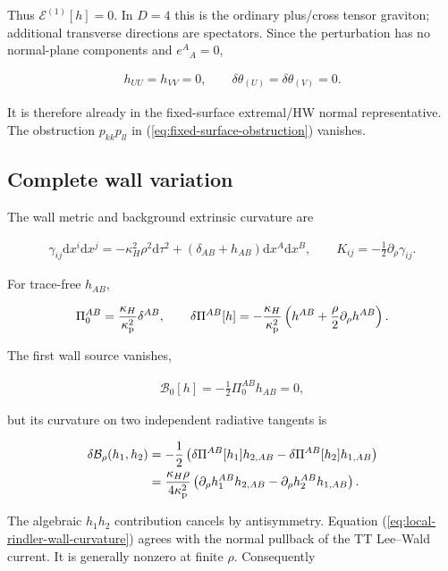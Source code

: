 Thus $\mathcal E^{(1)}[h]=0$. In $D=4$ this is the ordinary plus/cross tensor graviton; additional transverse directions are spectators. Since the perturbation has no normal-plane components and $e^A{}_A=0$,

\begin{align}
h_{UU}=h_{VV}=0,
\qquad
\delta\theta_{(U)}=\delta\theta_{(V)}=0.
\end{align}

It is therefore already in the fixed-surface extremal/HW normal representative. The obstruction $p_{kk}p_{ll}$ in (\ref{eq:fixed-surface-obstruction}) vanishes.

\subsection{Complete wall variation}\label{subsec:rindler-wall-variation}

The wall metric and background extrinsic curvature are

\begin{align}
\gamma_{ij}\mathrm dx^i\mathrm dx^j
=-\kappa_H^2\rho^2\mathrm d\tau^2
+(\delta_{AB}+h_{AB})\mathrm dx^A\mathrm dx^B,
\qquad
K_{ij}=-\frac12\partial_\rho\gamma_{ij}.
\end{align}

For trace-free $h_{AB}$,

\begin{align}
\Pi_0^{AB}=\frac{\kappa_H}{\kappa_{\rm p}^2}\delta^{AB},
\qquad
\delta\Pi^{AB}[h]
=-\frac{\kappa_H}{\kappa_{\rm p}^2}
\left(h^{AB}+\frac\rho2\partial_\rho h^{AB}\right).
\label{eq:local-rindler-momentum}
\end{align}

The first wall source vanishes,

\begin{align}
\mathcal B_0[h]
=-\frac12\Pi_0^{AB}h_{AB}=0,
\end{align}

but its curvature on two independent radiative tangents is

\begin{align}
\delta\mathcal B_\rho(h_1,h_2)
&=-\frac12\left(
\delta\Pi^{AB}[h_1]h_{2,AB}
-\delta\Pi^{AB}[h_2]h_{1,AB}
\right)\\
&=\frac{\kappa_H\rho}{4\kappa_{\rm p}^2}
\left(
\partial_\rho h_1^{AB}h_{2,AB}
-\partial_\rho h_2^{AB}h_{1,AB}
\right).
\label{eq:local-rindler-wall-curvature}
\end{align}

The algebraic $h_1h_2$ contribution cancels by antisymmetry. Equation (\ref{eq:local-rindler-wall-curvature}) agrees with the normal pullback of the TT Lee--Wald current. It is generally nonzero at finite $\rho$. Consequently


